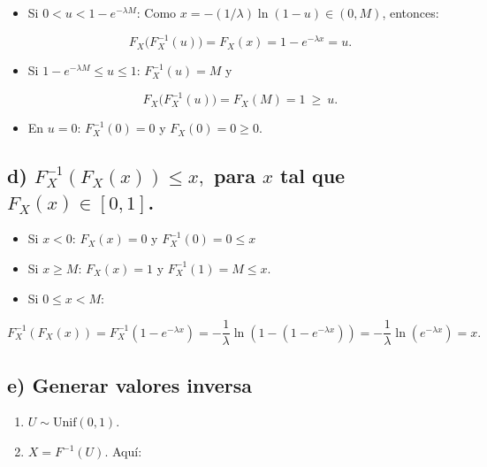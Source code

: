 \documentclass[10pt,a4paper]{article}
\providecommand{\tightlist}{%
      \setlength{\itemsep}{0pt}\setlength{\parskip}{0pt}}
\begin{document}
    \begin{itemize}
\item
  Si \(0<u<1-e^{-\lambda M}\): Como \(x=-(1/\lambda)\ln(1-u)\in(0,M)\),
  entonces:

  \[
  F_X\big(F_X^{-1}(u)\big)=F_X(x)=1-e^{-\lambda x}=u.
  \]
\item
  Si \(1-e^{-\lambda M}\leq u\le1\): \(F_X^{-1}(u)=M\) y

  \[
  F_X\big(F_X^{-1}(u)\big)=F_X(M)=1\ \ge\ u.
  \]
\item
  En \(u=0\): \(F_X^{-1}(0)=0\) y \(F_X(0)=0\geq 0\).
\end{itemize}

    \hypertarget{d-f-1_xf_xx-leq-x-para-x-tal-que-f_xx-in-0-1.}{%
\subsection{\texorpdfstring{d) \(F^{-1}_X(F_X(x)) \leq x,\) para \(x\)
tal que
\(F_X(x) \in [0, 1]\).}{d) F\^{}\{-1\}\_X(F\_X(x)) \textbackslash leq x, para x tal que F\_X(x) \textbackslash in {[}0, 1{]}.}}\label{d-f-1_xf_xx-leq-x-para-x-tal-que-f_xx-in-0-1.}}

    \begin{itemize}
\item
  Si \(x<0\): \(F_X(x)=0\) y \(F_X^{-1}(0)=0\leq x\)
\item
  Si \(x\geq M\): \(F_X(x)=1\) y \(F_X^{-1}(1)=M\leq x\).
\item
  Si \(0\leq x < M\):
\end{itemize}

\[
F_X^{-1}(F_X(x))=F_X^{-1}\left(1-e^{-\lambda x}\right)= -\dfrac{1}{\lambda}\ln(1-\left(1-e^{-\lambda x}\right))= -\dfrac{1}{\lambda}\ln(e^{-\lambda x})=x.
\]

    \hypertarget{e-cuxf3mo-generar-valores-con-el-muxe9todo-de-la-funciuxf3n-inversa}{%
\subsection{e) Generar valores
inversa}\label{e-cuxf3mo-generar-valores-con-el-muxe9todo-de-la-funciuxf3n-inversa}}

    \begin{enumerate}
\def\labelenumi{\arabic{enumi}.}
\tightlist
\item
  \(U\sim\mathrm{Unif}(0,1)\).
\item
  \(X=F^{-1}(U)\). Aquí:
\end{enumerate}
\end{document}
